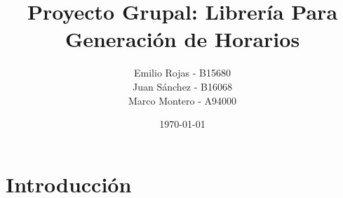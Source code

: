 \documentclass[10pt]{beamer}
\title{Proyecto Grupal: Librería Para Generación de Horarios}
\subtitle{}  %
\date{\today}
\author{
Emilio Rojas - B15680\\
  Juan Sánchez - B16068\\
  Marco Montero - A94000\\
  \href{mailto:}{{\tt}}
}
\institute[
  IE0217 - Estructuras de datos abstractas y algoritmos\\
  Escuela de Ingenieria Eléctrica\\
  Universidad de Costa Rica
] %
{%
  IE0217 - Estructuras de datos abstractas y algoritmos\\\
  Escuela de Ingenieria Eléctrica\\
  Universidad de Costa Rica

}
\begin{document}
\aauwavesbg

\begin{frame} %
\titlepage
\end{frame}


%









\section{Introducción}

%
%
\end{document}
